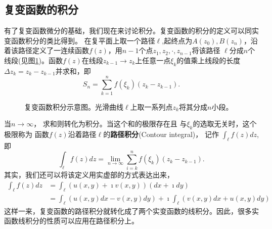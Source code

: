 \subsection[定义和性质]{复变函数的积分}
有了复变函数微分的基础，我们现在来讨论积分。复变函数的积分的定义可以同实变函数积分的类比得到。
在复平面上取一个路径$\ell$,起终点为$A(z_0),B(z_n)$，沿着该路径定义了一连续函数$f(z)$，用$n-1$个点$z_1, z_2,\cdot, z_{n-1}$将该路径
$\ell$分成$n$个线段(见图\ref{fig:complex_integral})。函数$f(z)$在线段$z_{k-1}\rightarrow z_{k}$上任意一点$\xi_k$的值乘上线段的长度$\Delta z_k = z_k - z_{k-1}$并求和，即
\begin{equation}
    S_n = \sum_{k=1}^{n} f(\xi_k) (z_{k} - z_{k-1}) .
\end{equation}
\begin{figure}[htbp]
    \centering
    
    \caption{复变函数积分示意图。光滑曲线$\ell$上取一系列点$z_k$将其分成$n$小段。}
    \label{fig:complex_integral}
\end{figure}
当$n\to \infty$， 求和则转化为积分。当这个和的极限存在且
与$\xi_k$的选取无关时，这个极限称为
函数$f(z)$沿着路径$\ell$的\textbf{路径积分}(Contour integral)， 记作
$\int_{\ell} f(z) dz$,即
\begin{equation}
    \int_{\ell} f(z) dz = \lim_{n\to \infty} \sum_{i=k}^{n} f(\xi_k) (z_{k} - z_{k-1}) . 
\end{equation}
其实，我们还可以将该定义用实虚部的方式表达出来，
\begin{align}
    \int_{\ell} f(z) dz  & = \int_{\ell} \left( u(x,y) + \imath v(x,y) \right) (dx + \imath dy) 
    \\
    & = \int_{\ell} \left( u(x,y) dx  -  v(x,y) dy \right) + \imath \int_{\ell}  \left( v(x,y) dx  + u(x,y)dy \right) 
\end{align}
这样一来，复变函数的路径积分就转化成了两个实变函数的线积分。因此，很多实函数线积分的性质可以应用在路径积分上。


